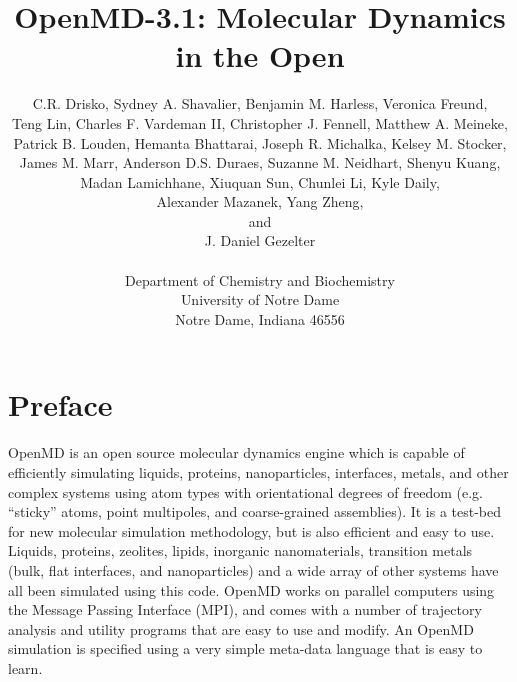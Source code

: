 \documentclass[letterpaper]{report}
\begin{document}





\title{OpenMD-3.1: Molecular Dynamics in the Open}

\author{C.R. Drisko, Sydney A. Shavalier,  Benjamin M. Harless, Veronica Freund, \\
  Teng Lin,  Charles F. Vardeman II, Christopher J. Fennell, Matthew  A. Meineke, \\
  Patrick B. Louden,   Hemanta Bhattarai, Joseph R. Michalka, Kelsey M. Stocker, \\
  James M. Marr,  Anderson D.S. Duraes, Suzanne M. Neidhart, Shenyu Kuang,  \\
  Madan Lamichhane, Xiuquan Sun, Chunlei Li, Kyle Daily, \\
  Alexander Mazanek,  Yang Zheng, \\ and \\
  J. Daniel Gezelter \\ \\
  Department of Chemistry and Biochemistry\\
  University of Notre Dame\\
  Notre Dame, Indiana 46556}

\maketitle

\section*{Preface} 

OpenMD is an open source molecular dynamics engine which is
capable of efficiently simulating liquids, proteins, nanoparticles,
interfaces, metals, and other complex systems using atom types with
orientational degrees of freedom (e.g. ``sticky'' atoms, point
multipoles, and coarse-grained assemblies). It is a test-bed for new
molecular simulation methodology, but is also efficient and easy to
use.  Liquids, proteins, zeolites, lipids, inorganic nanomaterials,
transition metals (bulk, flat interfaces, and nanoparticles) and a
wide array of other systems have all been simulated using this
code. OpenMD works on parallel computers using the Message
Passing Interface (MPI), and comes with a number of trajectory
analysis and utility programs that are easy to use and modify. An
OpenMD simulation is specified using a very simple meta-data language
that is easy to learn.
\end{document}
